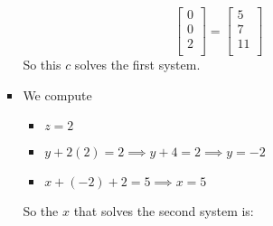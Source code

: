 \documentclass[12pt,letterpaper]{article}
\begin{document}
\begin{enumerate}
\begin{enumerate}
\begin{itemize}
\[\begin{bmatrix}
                   0 \\
                   0 \\
                   2 \\
                \end{bmatrix}
                =
                \begin{bmatrix}
                  5  \\
                  7  \\
                  11 \\
                \end{bmatrix}
              \]
              So this $c$ solves the first system.
            \item
              We compute
              \begin{itemize}
                \item $              z = 2$
                \item $    y    + 2(2) = 2 \implies y + 4 = 2 \implies y = -2$
                \item $x + (-2) + 2    = 5 \implies x = 5$
              \end{itemize}
              So the $x$ that solves the second system is:


\end{itemize}
\end{enumerate}
\end{enumerate}
\end{document}
